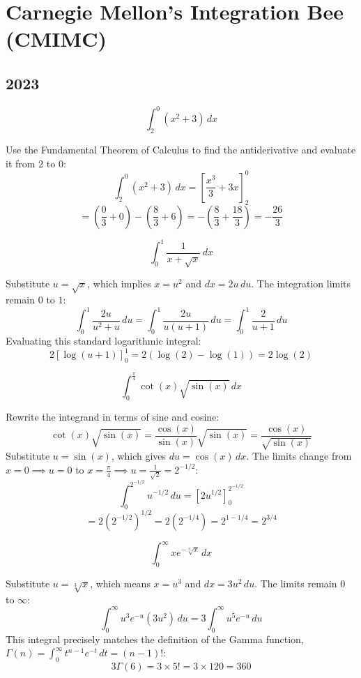 \section{Carnegie Mellon's Integration Bee (CMIMC)}
\subsection*{2023}
\begin{questions}
    \question \[ \int_2^0 (x^2 + 3) \,dx \]
    \begin{solution}
        Use the Fundamental Theorem of Calculus to find the antiderivative and evaluate it from $2$ to $0$:
        \[ \int_2^0 (x^2 + 3) \,dx = \left[ \frac{x^3}{3} + 3x \right]_2^0 \]
        \[ = \left( \frac{0}{3} + 0 \right) - \left( \frac{8}{3} + 6 \right) = - \left( \frac{8}{3} + \frac{18}{3} \right) = -\frac{26}{3} \]
    \end{solution}

    \question \[ \int_0^1 \frac{1}{x + \sqrt{x}} \,dx \]
    \begin{solution}
        Substitute $u = \sqrt{x}$, which implies $x = u^2$ and $dx = 2u \,du$. The integration limits remain $0$ to $1$:
        \[ \int_0^1 \frac{2u}{u^2 + u} \,du = \int_0^1 \frac{2u}{u(u + 1)} \,du = \int_0^1 \frac{2}{u + 1} \,du \]
        Evaluating this standard logarithmic integral:
        \[ 2 \left[ \log(u + 1) \right]_0^1 = 2(\log(2) - \log(1)) = 2\log(2) \]
    \end{solution}

    \question \[ \int_0^{\frac{\pi}{4}} \cot(x) \sqrt{\sin(x)} \,dx \]
    \begin{solution}
        Rewrite the integrand in terms of sine and cosine:
        \[ \cot(x) \sqrt{\sin(x)} = \frac{\cos(x)}{\sin(x)} \sqrt{\sin(x)} = \frac{\cos(x)}{\sqrt{\sin(x)}} \]
        Substitute $u = \sin(x)$, which gives $du = \cos(x) \,dx$. The limits change from $x = 0 \implies u = 0$ to $x = \frac{\pi}{4} \implies u = \frac{1}{\sqrt{2}} = 2^{-1/2}$:
        \[ \int_0^{2^{-1/2}} u^{-1/2} \,du = \left[ 2u^{1/2} \right]_0^{2^{-1/2}} \]
        \[ = 2\left(2^{-1/2}\right)^{1/2} = 2(2^{-1/4}) = 2^{1 - 1/4} = 2^{3/4} \]
    \end{solution}

    \question \[ \int_0^\infty x e^{-\sqrt[3]{x}} \,dx \]
    \begin{solution}
        Substitute $u = \sqrt[3]{x}$, which means $x = u^3$ and $dx = 3u^2 \,du$. The limits remain $0$ to $\infty$:
        \[ \int_0^\infty u^3 e^{-u} (3u^2) \,du = 3 \int_0^\infty u^5 e^{-u} \,du \]
        This integral precisely matches the definition of the Gamma function, $\Gamma(n) = \int_0^\infty t^{n-1} e^{-t} \,dt = (n-1)!$:
        \[ 3 \Gamma(6) = 3 \times 5! = 3 \times 120 = 360 \]
    \end{solution}


\end{questions}

